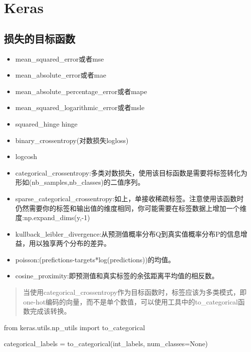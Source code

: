 \section{Keras}
\subsection{损失的目标函数}
\begin{itemize}
\item mean\_squared\_error或者mse
\item mean\_absolute\_error或者mae
\item mean_absolute\_percentage\_error或者mape
\item mean\_squared\_logarithmic\_error或者msle
\item squared\_hinge
\itme hinge
\item binary\_crossentropy(对数损失logloss)
\item logcosh
\item categorical\_crossentropy:多类对数损失，使用该目标函数是需要将标签转化为形如(nb\_samples,nb\_classes)的二值序列。
\item sparse\_categorical\_crossentropy:如上，单接收稀疏标签。注意使用该函数时仍然需要你的标签和输出值的维度相同，你可能需要在标签数据上增加一个维度:np.expand\_dims(y,-1)
\item kullback\_leibler\_divergence:从预测值概率分布Q到真实值概率分布P的信息增益，用以独享两个分布的差异。
\item poisson:(prefictions-targets*log(predictions))的均值。
\item cosine\_proximity:即预测值和真实标签的余弦距离平均值的相反数。
\end{itemize}
\begin{quote}
当使用categorical\_crossentropy作为目标函数时，标签应该为多类模式，即one-hot编码的向量，而不是单个数值，可以使用工具中的to\_categorical函数完成该转换。
\end{quote}
\begin{python}
from keras.utils.np_utils import to_categorical

categorical_labels = to_categorical(int_labels, num_classes=None)
\end{python}